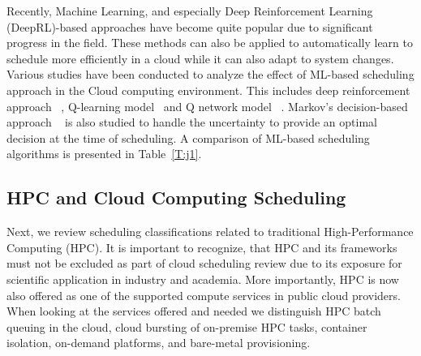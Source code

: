 \documentclass[final,5p,times,twocolumn]{elsarticle}
\begin{document}
Recently, Machine Learning, and especially Deep Reinforcement Learning (DeepRL)-based approaches have become quite popular due to significant progress in the field. These methods can also be applied to automatically learn to schedule more efficiently in a cloud while it can also adapt to system changes. Various studies have been conducted to analyze the effect of ML-based scheduling approach in the Cloud computing environment. This includes deep reinforcement approach ~\cite{cheng2018drl,mao2018learning}, Q-learning model~\cite{zhang2017energy} and Q network model ~\cite{wang2019multi}. Markov's decision-based approach ~\cite{barrett2013applying} is also studied to handle the uncertainty to provide an optimal decision at the time of scheduling. A comparison of ML-based scheduling algorithms is presented in Table~\ref{T:j1}.

%



\subsection{HPC and Cloud Computing Scheduling}
\label{sec:hpc}


Next, we review scheduling classifications related to traditional High-Performance Computing (HPC). It is important to recognize, that HPC and its frameworks must not be excluded as part of cloud scheduling review due to its exposure for scientific application in industry and academia. More importantly, HPC is now also offered as one of the supported compute services in public cloud providers. When looking at the services offered and needed we distinguish HPC batch queuing in the cloud, cloud bursting of on-premise HPC tasks, container isolation, on-demand platforms, and bare-metal provisioning.
\end{document}
